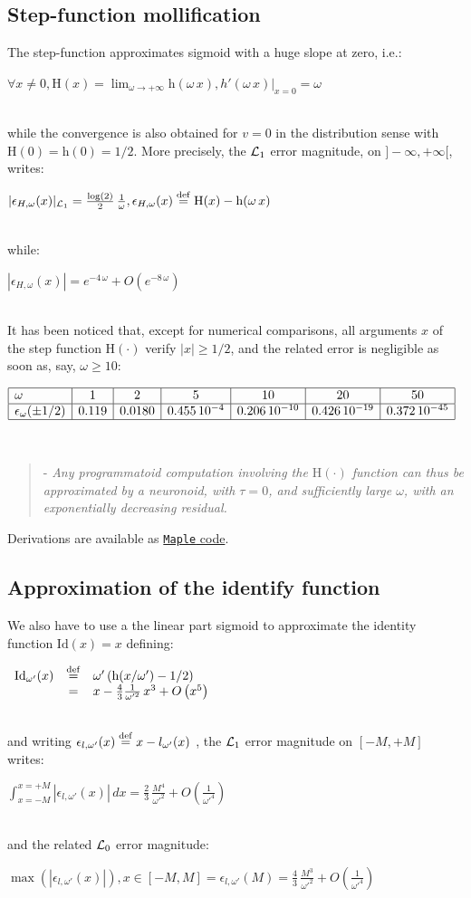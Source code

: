 \documentclass[a4]{article} \usepackage[left=2cm,right=3cm,top=1cm,bottom=2cm]{geometry}
\newcommand{\eqline}[1]{~\vspace{0.1cm}\\\centerline{$#1$}\vspace{0.1cm}\\}
\newcommand{\defq}{\stackrel {\rm def}{=}}
\begin{document}
\subsection{Step-function mollification}

The step-function approximates sigmoid with a huge slope at zero, i.e.:
\eqline{\forall x \ne 0, \mbox{H}(x) = \lim_{\omega  \rightarrow +\infty} \mbox{h}(\omega \, x), \left. h'(\omega \, x)  \right|_{x = 0} =  \omega}
while the convergence is also obtained for $v=0$ in the distribution sense with $\mbox{H}(0) = \mbox{h}(0) = 1/2$.
More precisely, the ${\cal L}_1$ error magnitude, on $]-\infty, +\infty[$, writes:
\eqline{|\epsilon_{H,\omega}(x) |_{{\cal L}_1} = \frac{\log(2)}{2} \, \frac{1}{\omega}, \epsilon_{H,\omega}(x) \defq \mbox{H}(x) - \mbox{h}(\omega \, x)}
while:
\eqline{|\epsilon_{H,\omega}(x)| = e^{-4\,\omega}+O\left(e^{-8\,\omega}\right)}

It has been noticed that, except for numerical comparisons, all arguments $x$ of the step function $\mbox{H}(\cdot)$ verify $|x| \ge 1/2$, and the related error is negligible as soon as, say, $\omega \ge 10$:
\eqline{\begin{array}{|l|c|c|c|c|c|c|} \hline
  \omega & 1 & 2 & 5 & 10 & 20 & 50 \\ \hline
  \epsilon_\omega(\pm1/2) & 0.119 &  0.0180 &  0.455 \, 10^{-4} &  0.206 \, 10^{-10} &  0.426 \, 10^{-19} &  0.372 \, 10^{-45} \\ \hline
\end{array}}

\begin{quotation}
- {\em Any programmatoid  computation involving the $\mbox{H}(\cdot)$ function can thus be approximated by a neuronoid, with $\tau = 0$, and sufficiently large $\omega$, with an exponentially decreasing residual.}
\end{quotation}
  
Derivations are available as \href{https://raw.githubusercontent.com/vthierry/braincraft/master/doc/tex/mollificatio.mpl.out.txt}{{\tt Maple} code}.

\subsection{Approximation of the identify function}

We also have to use a the linear part sigmoid to approximate the identity function $\mbox{Id}(x) = x$ defining:
\eqline{\begin{array}{rcl}
   \mbox{Id}_{\omega'}(x) &\defq& \omega' \, (\mbox{h}(x/\omega') - 1/2) \\
                           &=& x - \frac{4}{3} \frac{1}{\omega'^2} \, x^3 + O\left(x^5\right) \\
\end{array}} 
and writing $\epsilon_{l,\omega'}(x) \defq x - l_{\omega'}(x)$ , the ${\cal L}_1$ error magnitude on $[-M, +M]$ writes:
\eqline{\int_{x=-M}^{x=+M}|\epsilon_{l,\omega'}(x)| \, dx = \frac{2}{3} \, \frac{M^4}{\omega'^2} + O\left(\frac{1}{\omega'^4}\right)}
and the related ${\cal L}_0$ error magnitude:
\eqline{\max(|\epsilon_{l,\omega'}(x)|), x \in [-M, M] = \epsilon_{l,\omega'}(M)  = \frac{4}{3} \, \frac{M^3}{\omega'^2} + O\left(\frac{1}{\omega'^4}\right)}
\end{document}
